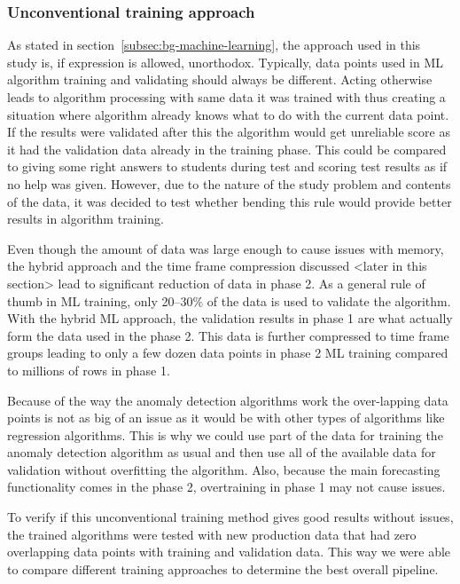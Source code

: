 \subsubsection*{Unconventional training approach}

As stated in section~\ref{subsec:bg-machine-learning},
the approach used in this study is,
if expression is allowed, unorthodox. %
Typically,
data points used in ML algorithm training and validating
should always be different.
Acting otherwise
leads to algorithm processing with
same data it was trained with
thus creating a situation
where algorithm already knows what to do with the current data point.
If the results were validated after this
the algorithm would get unreliable score
as it had the validation data already in the training phase.
This could be compared to
giving some right answers to students
during test and scoring test results as if
no help was given.
However,
due to the nature of the study problem and contents of the data,
it was decided to test whether bending this rule
would provide better results in algorithm training.

Even though the amount of data was large enough
to cause issues with memory,
the hybrid approach and the time frame compression discussed <later in this section> %
lead to significant reduction of data in phase 2.
As a general rule of thumb in ML training,
only 20--30\% of the data is used to validate the algorithm.
With the hybrid ML approach,
the validation results in phase 1
are what actually form the data used in the phase 2.
This data is further compressed to time frame groups
leading to only a few dozen data points in phase 2 ML training %
compared to millions of rows in phase 1.

Because of the way the anomaly detection algorithms work
the over-lapping data points is not as big of an issue
as it would be with other types of algorithms
like regression algorithms. %
This is why we could use part of the data
for training the anomaly detection algorithm as usual
and then use all of the available data for validation
without overfitting the algorithm. %
Also, because the main forecasting functionality comes in the phase 2,
overtraining %
in phase 1 may not cause issues. %

To verify if this unconventional training method gives good results without issues,
the trained algorithms were tested with new production data
that had zero overlapping data points with training and validation data.
This way we were able to compare different training approaches
to determine the best overall pipeline.



